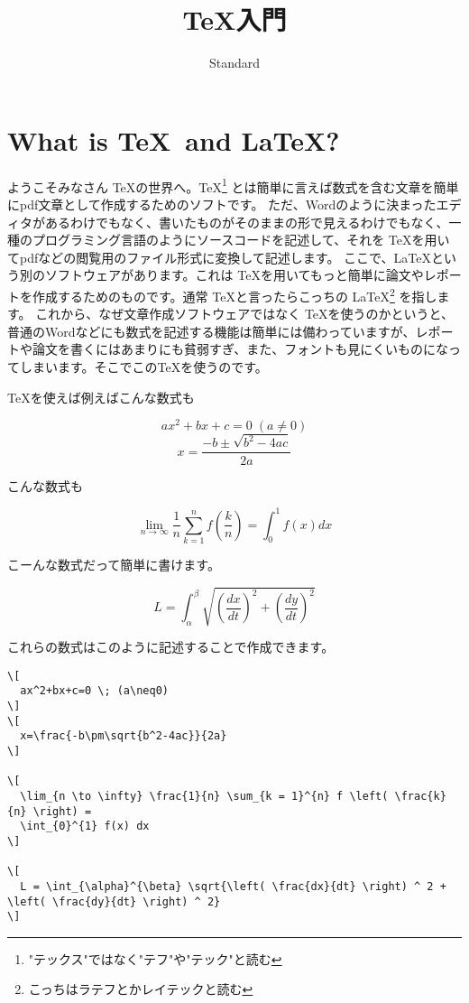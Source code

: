 \documentclass[paper=b5j]{jlreq}
\begin{document}
\title{\TeX 入門}
\author{Standard}
\maketitle

\section{What is \TeX\ and \LaTeX?}

ようこそみなさん \TeX の世界へ。\TeX \footnote{"テックス"ではなく"テフ"や"テック"と読む} とは簡単に言えば数式を含む文章を簡単にpdf文章として作成するためのソフトです。
ただ、Wordのように決まったエディタがあるわけでもなく、書いたものがそのままの形で見えるわけでもなく、一種のプログラミング言語のようにソースコードを記述して、それを \TeX を用いてpdfなどの閲覧用のファイル形式に変換して記述します。
ここで、\LaTeX という別のソフトウェアがあります。これは \TeX を用いてもっと簡単に論文やレポートを作成するためのものです。通常 \TeX と言ったらこっちの \LaTeX \footnote{こっちはラテフとかレイテックと読む} を指します。
これから、なぜ文章作成ソフトウェアではなく \TeX を使うのかというと、普通のWordなどにも数式を記述する機能は簡単には備わっていますが、レポートや論文を書くにはあまりにも貧弱すぎ、また、フォントも見にくいものになってしまいます。そこでこの\TeX を使うのです。

\TeX を使えば例えばこんな数式も

\[
  ax^2+bx+c=0 \; (a\neq0)
\]
\[
  x=\frac{-b\pm\sqrt{b^2-4ac}}{2a}
\]

こんな数式も

\[
  \lim_{n \to \infty} \frac{1}{n} \sum_{k = 1}^{n} f \left( \frac{k}{n} \right) =
  \int_{0}^{1} f(x) dx
\]

こーんな数式だって簡単に書けます。

\[
  L = \int_{\alpha}^{\beta} \sqrt{\left( \frac{dx}{dt} \right) ^ 2 + \left( \frac{dy}{dt} \right) ^ 2}
\]

これらの数式はこのように記述することで作成できます。

\begin{lstlisting}[caption=LaTeX]
\[
  ax^2+bx+c=0 \; (a\neq0)
\]
\[
  x=\frac{-b\pm\sqrt{b^2-4ac}}{2a}
\]

\[
  \lim_{n \to \infty} \frac{1}{n} \sum_{k = 1}^{n} f \left( \frac{k}{n} \right) =
  \int_{0}^{1} f(x) dx
\]

\[
  L = \int_{\alpha}^{\beta} \sqrt{\left( \frac{dx}{dt} \right) ^ 2 + \left( \frac{dy}{dt} \right) ^ 2}
\]
\end{lstlisting}
\end{document}
